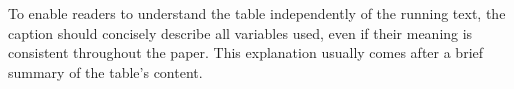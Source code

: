 


\noindent To enable readers to understand the table independently of the running text, the caption should concisely describe all variables used, even if their meaning is consistent throughout the paper.
This explanation usually comes after a brief summary of the table's content.
